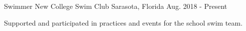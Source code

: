 \begin{cventries}
  \cventry
    {Swimmer} %
    {New College Swim Club} %
    {Sarasota, Florida} %
    {Aug. 2018 - Present} %
    {
      \begin{cvitems} %
        \item {Supported and participated in practices and events for the school swim team.}
      \end{cvitems}
    }


\end{cventries}
